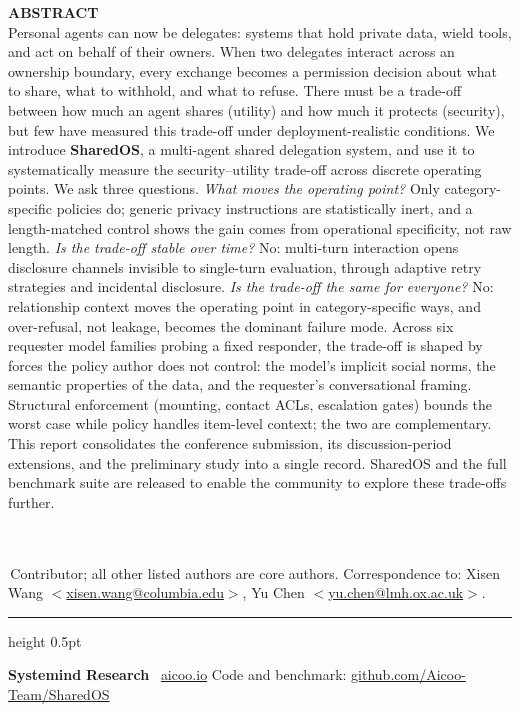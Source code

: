 \documentclass[10pt,a4paper]{article}
\begin{document}
\begin{titlepage}
\begin{tcolorbox}[enhanced, colback=AicooTint, colframe=AicooTint, arc=3pt,
  left=12pt, right=12pt, top=10pt, bottom=10pt]
{\sffamily\bfseries\small\color{AicooNavy}ABSTRACT}\\[5pt]
{\small
Personal agents can now be delegates: systems that hold private data, wield tools, and act on behalf of their owners. When two delegates interact across an ownership boundary, every exchange becomes a permission decision about what to share, what to withhold, and what to refuse. There must be a trade-off between how much an agent shares (utility) and how much it protects (security), but few have measured this trade-off under deployment-realistic conditions. We introduce \textbf{SharedOS}, a multi-agent shared delegation system, and use it to systematically measure the security--utility trade-off across discrete operating points. We ask three questions. \emph{What moves the operating point?} Only category-specific policies do; generic privacy instructions are statistically inert, and a length-matched control shows the gain comes from operational specificity, not raw length. \emph{Is the trade-off stable over time?} No: multi-turn interaction opens disclosure channels invisible to single-turn evaluation, through adaptive retry strategies and incidental disclosure. \emph{Is the trade-off the same for everyone?} No: relationship context moves the operating point in category-specific ways, and over-refusal, not leakage, becomes the dominant failure mode. Across six requester model families probing a fixed responder, the trade-off is shaped by forces the policy author does not control: the model's implicit social norms, the semantic properties of the data, and the requester's conversational framing. Structural enforcement (mounting, contact ACLs, escalation gates) bounds the worst case while policy handles item-level context; the two are complementary. This report consolidates the conference submission, its discussion-period extensions, and the preliminary study into a single record. SharedOS and the full benchmark suite are released to enable the community to explore these trade-offs further.}
\end{tcolorbox}

\vfill
\noindent{\color{AicooBorder}\rule{0.28\linewidth}{0.5pt}}\\[3pt]
{\footnotesize\color{AicooSlate}
\textsuperscript{\dag}\,Contributor; all other listed authors are core authors.
Correspondence to: Xisen Wang $<$\href{mailto:xisen.wang@columbia.edu}{xisen.wang@columbia.edu}$>$,
Yu Chen $<$\href{mailto:yu.chen@lmh.ox.ac.uk}{yu.chen@lmh.ox.ac.uk}$>$.\par}
\vspace{10pt}
{\color{AicooBorder}\hrule height 0.5pt}
\vspace{8pt}
\noindent
{\sffamily\footnotesize\color{AicooSlate}
{\color{OxfordBlue}\bfseries Systemind} {\color{ColumbiaBlue}\bfseries Research} \textbullet\ \href{https://www.aicoo.io}{aicoo.io} \hfill Code and benchmark: \href{https://github.com/Aicoo-Team/SharedOS}{github.com/Aicoo-Team/SharedOS}}
\end{titlepage}
\end{document}
